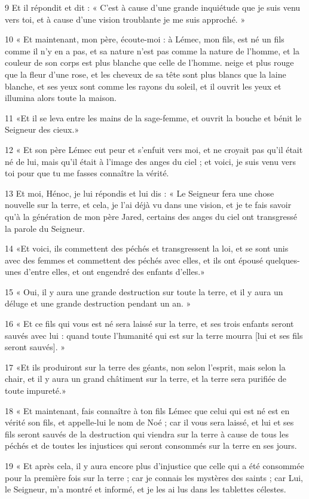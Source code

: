 \par 9 Et il répondit et dit : « C'est à cause d'une grande inquiétude que je suis venu vers toi, et à cause d'une vision troublante je me suis approché. »
\par 10 « Et maintenant, mon père, écoute-moi : à Lémec, mon fils, est né un fils comme il n'y en a pas, et sa nature n'est pas comme la nature de l'homme, et la couleur de son corps est plus blanche que celle de l'homme. neige et plus rouge que la fleur d'une rose, et les cheveux de sa tête sont plus blancs que la laine blanche, et ses yeux sont comme les rayons du soleil, et il ouvrit les yeux et illumina alors toute la maison.
\par 11 «Et il se leva entre les mains de la sage-femme, et ouvrit la bouche et bénit le Seigneur des cieux.»
\par 12 « Et son père Lémec eut peur et s'enfuit vers moi, et ne croyait pas qu'il était né de lui, mais qu'il était à l'image des anges du ciel ; et voici, je suis venu vers toi pour que tu me fasses connaître la vérité.
\par 13 Et moi, Hénoc, je lui répondis et lui dis : « Le Seigneur fera une chose nouvelle sur la terre, et cela, je l'ai déjà vu dans une vision, et je te fais savoir qu'à la génération de mon père Jared, certains des anges du ciel ont transgressé la parole du Seigneur.
\par 14 «Et voici, ils commettent des péchés et transgressent la loi, et se sont unis avec des femmes et commettent des péchés avec elles, et ils ont épousé quelques-unes d'entre elles, et ont engendré des enfants d'elles.»
\par 15 « Oui, il y aura une grande destruction sur toute la terre, et il y aura un déluge et une grande destruction pendant un an. »
\par 16 « Et ce fils qui vous est né sera laissé sur la terre, et ses trois enfants seront sauvés avec lui : quand toute l'humanité qui est sur la terre mourra [lui et ses fils seront sauvés]. »
\par 17 «Et ils produiront sur la terre des géants, non selon l'esprit, mais selon la chair, et il y aura un grand châtiment sur la terre, et la terre sera purifiée de toute impureté.»
\par 18 « Et maintenant, fais connaître à ton fils Lémec que celui qui est né est en vérité son fils, et appelle-lui le nom de Noé ; car il vous sera laissé, et lui et ses fils seront sauvés de la destruction qui viendra sur la terre à cause de tous les péchés et de toutes les injustices qui seront consommés sur la terre en ses jours.
\par 19 « Et après cela, il y aura encore plus d'injustice que celle qui a été consommée pour la première fois sur la terre ; car je connais les mystères des saints ; car Lui, le Seigneur, m'a montré et informé, et je les ai lus dans les tablettes célestes.

